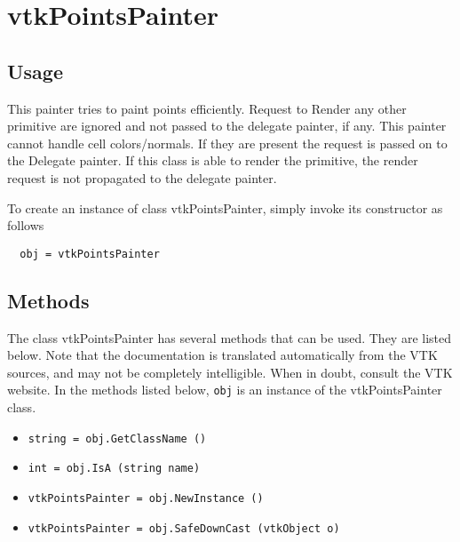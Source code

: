 \section{vtkPointsPainter}

\subsection{Usage}

 This painter tries to paint points efficiently. Request to Render
 any other primitive are ignored and not passed to the delegate painter, 
 if any. This painter cannot handle cell colors/normals. If they are 
 present the request is passed on to the Delegate painter. If this 
 class is able to render the primitive, the render request is not
 propagated to the delegate painter.

To create an instance of class vtkPointsPainter, simply
invoke its constructor as follows
\begin{verbatim}
  obj = vtkPointsPainter
\end{verbatim}
\subsection{Methods}

The class vtkPointsPainter has several methods that can be used.
  They are listed below.
Note that the documentation is translated automatically from the VTK sources,
and may not be completely intelligible.  When in doubt, consult the VTK website.
In the methods listed below, \verb|obj| is an instance of the vtkPointsPainter class.
\begin{itemize}
\item  \verb|string = obj.GetClassName ()|

\item  \verb|int = obj.IsA (string name)|

\item  \verb|vtkPointsPainter = obj.NewInstance ()|

\item  \verb|vtkPointsPainter = obj.SafeDownCast (vtkObject o)|

\end{itemize}

